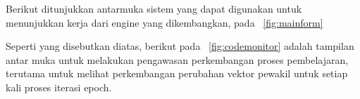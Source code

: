 Berikut ditunjukkan antarmuka sistem yang dapat digunakan untuk menunjukkan
kerja dari engine yang dikembangkan, pada \pic~\ref{fig:mainform}

Seperti yang disebutkan diatas, berikut pada \pic~\ref{fig:codemonitor} adalah
tampilan antar muka untuk melakukan pengawasan perkembangan proses pembelajaran,
terutama untuk melihat perkembangan perubahan vektor pewakil untuk setiap  kali
proses iterasi epoch.


